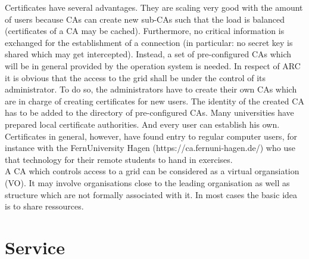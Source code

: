 Certificates have several advantages.
They are scaling very good with the amount of users because CAs can create new sub-CAs such that the load is balanced (certificates of a CA may be cached).
Furthermore, no critical information is exchanged for the establishment of a connection (in particular: no secret key is shared which may get intercepted).
Instead, a set of pre-configured CAs which will be in general provided by the operation system is needed.
In respect of ARC it is obvious that the access to the grid shall be under the control of its administrator.
To do so, the administrators have to create their own CAs which are in charge of creating certificates for new users.
The identity of the created CA has to be added to the directory of pre-configured CAs.
Many universities have prepared local certificate authorities. And every user can establish his own. Certificates in general, however, have found entry to regular computer users, for instance with the FernUniversity Hagen (https://ca.fernuni-hagen.de/) who use that technology for their remote students to hand in exercises.\\


A CA which controls access to a grid can be considered as a virtual organsiation (VO).
It may involve organisations close to the leading organisation as well as structure which are not formally associated with it.
In most cases the basic idea is to share ressources. 

\clearpage
\section{Service}


